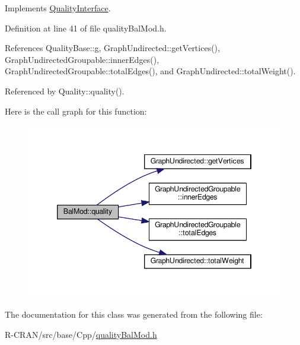 Implements \hyperlink{classQualityInterface_a1c40b3e5e51d8ed2a4390b3cb0164f0a}{Quality\+Interface}.



Definition at line 41 of file quality\+Bal\+Mod.\+h.



References Quality\+Base\+::g, Graph\+Undirected\+::get\+Vertices(), Graph\+Undirected\+Groupable\+::inner\+Edges(), Graph\+Undirected\+Groupable\+::total\+Edges(), and Graph\+Undirected\+::total\+Weight().



Referenced by Quality\+::quality().

Here is the call graph for this function\+:
\nopagebreak
\begin{figure}[H]
\begin{center}
\leavevmode
\includegraphics[width=346pt]{classBalMod_a5cfc9f2446c0734496440aa7fcfc2a9a_cgraph}
\end{center}
\end{figure}


The documentation for this class was generated from the following file\+:\begin{DoxyCompactItemize}
\item 
R-\/\+C\+R\+A\+N/src/base/\+Cpp/\hyperlink{qualityBalMod_8h}{quality\+Bal\+Mod.\+h}\end{DoxyCompactItemize}

